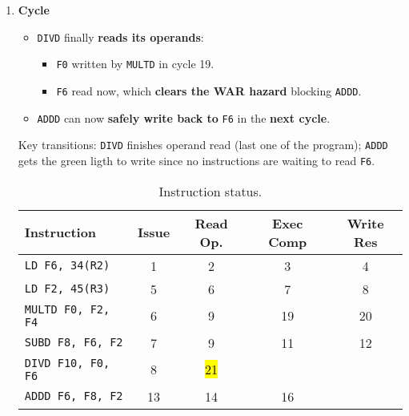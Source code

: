 \begin{enumerate}
    \newpage


    \item \textbf{Cycle \theenumi}
    \begin{itemize}
        \item[\textcolor{Green3}{\faIcon{check}}] \texttt{DIVD} finally \textbf{reads its operands}:
        \begin{itemize}
            \item \texttt{F0} written by \texttt{MULTD} in cycle 19.
            \item \texttt{F6} read now, which \textbf{clears the WAR hazard} blocking \texttt{ADDD}.
        \end{itemize}
        \item[\textcolor{Green3}{\faIcon{check}}] \texttt{ADDD} can now \textbf{safely write back to} \texttt{F6} in the \textbf{next cycle}.
    \end{itemize}
    Key transitions: \texttt{DIVD} finishes operand read (last one of the program); \texttt{ADDD} gets the green ligth to write since no instructions are waiting to read \texttt{F6}.

    \begin{table}[!htp]
        \centering
        \begin{tabular}{@{} l | c c c c @{}}
            \toprule
            Instruction                 & Issue     & Read Op.  & Exec Comp & Write Res \\
            \midrule
            \texttt{LD    F6, 34(R2)}   & 1         & 2         & 3         & 4         \\ [.3em]
            \texttt{LD    F2, 45(R3)}   & 5         & 6         & 7         & 8         \\ [.3em]
            \texttt{MULTD F0, F2, F4}   & 6         & 9         & 19        & 20        \\ [.3em]
            \texttt{SUBD  F8, F6, F2}   & 7         & 9         & 11        & 12        \\ [.3em]
            \texttt{DIVD  F10, F0, F6}  & 8         & \hl{21}   &           &           \\ [.3em]
            \texttt{ADDD  F6, F8, F2}   & 13        & 14        & 16        &           \\
            \bottomrule
        \end{tabular}
        \caption*{Instruction status.}
    \end{table}


\end{enumerate}
